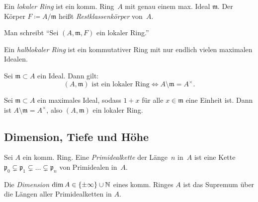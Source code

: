 \documentclass{cheat-sheet}
\newcommand{\ppp}{\mathfrak{p}}
\newcommand{\mmm}{\mathfrak{m}}
\begin{document}

\begin{defn}
  Ein \emph{lokaler Ring} ist ein komm. Ring~$A$ mit genau einem max. Ideal $\mmm$.
  Der Körper $F \coloneqq A/\mmm$ heißt \emph{Restklassenkörper} von~$A$.
\end{defn}

\begin{nota}
  Man schreibt "`Sei $(A, \mmm, F)$ ein lokaler Ring."'
\end{nota}

\begin{defn}
  Ein \emph{halblokaler Ring} ist ein kommutativer Ring mit nur endlich vielen maximalen Idealen.
\end{defn}

\begin{lem}
  Sei $\mmm \subset A$ ein Ideal. Dann gilt:
  \[
    (A, \mmm) \text{ ist ein lokaler Ring}
    \iff
    A \setminus \mmm = A^\times.
  \]
\end{lem}

\begin{prop}
  Sei $\mmm \subset A$ ein maximales Ideal, sodass $1 + x$ für alle $x \in \mmm$ eine Einheit ist.
  Dann ist $A \setminus \mmm = A^\times$, also $(A, \mmm)$ ein lokaler Ring.
\end{prop}

\subsection{Dimension, Tiefe und Höhe}

\begin{defn}
  Sei $A$ ein komm. Ring.
  Eine \emph{Primidealkette} der Länge~$n$ in~$A$ ist eine Kette $\ppp_0 \subsetneq \ppp_1 \subsetneq \ldots \subsetneq \ppp_n$ von Primidealen in~$A$.
\end{defn}

\begin{defn}
  Die \emph{Dimension} $\dim A \in \{ \pm \infty \} \cup \mathbb{N}$ eines komm. Ringes $A$ ist das Supremum über die Längen aller Primidealketten in $A$.
\end{defn}

\begin{bspe}
   \quad
   \quad
\end{bspe}
\end{document}
